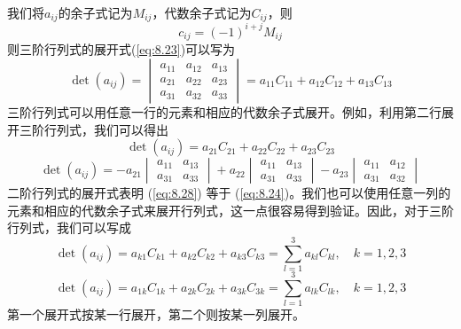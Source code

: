     我们将$a_{ij}$的余子式记为$M_{ij}$，代数余子式记为$C_{ij}$，则
    \begin{equation}
        c_{ij} = \left(-1\right)^{i+j}M_{ij}
        \label{eq:8.25}
    \end{equation}
    则三阶行列式的展开式(\ref{eq:8.23})可以写为
    \begin{equation}
        \det\left(a_{ij}\right) = \begin{vmatrix}
            a_{11} & a_{12} & a_{13} \\
            a_{21} & a_{22} & a_{23} \\
            a_{31} & a_{32} & a_{33}
        \end{vmatrix} = a_{11}C_{11} + a_{12}C_{12} + a_{13}C_{13}
        \label{eq:8.26}
    \end{equation}
    三阶行列式可以用任意一行的元素和相应的代数余子式展开。例如，利用第二行展开三阶行列式，我们可以得出
    \begin{equation}
        \det\left(a_{ij}\right) = a_{21}C_{21} + a_{22}C_{22} + a_{23}C_{23}
        \label{eq:8.27}
    \end{equation}
    \begin{equation}
        \det\left(a_{ij}\right) = -a_{21}\begin{vmatrix}
            a_{11} & a_{13} \\
            a_{31} & a_{33}
        \end{vmatrix} + a_{22}\begin{vmatrix}
            a_{11} & a_{13} \\
            a_{31} & a_{33}
        \end{vmatrix} - a_{23}\begin{vmatrix}
            a_{11} & a_{12} \\
            a_{31} & a_{32}
        \end{vmatrix}
        \label{eq:8.28}
    \end{equation}
    二阶行列式的展开式表明 (\ref{eq:8.28}) 等于 (\ref{eq:8.24})。我们也可以使用任意一列的元素和相应的代数余子式来展开行列式，这一点很容易得到验证。因此，对于三阶行列式，我们可以写成
    \begin{equation*}
        \det\left(a_{ij}\right) = a_{k1}C_{k1} + a_{k2}C_{k2} + a_{k3}C_{k3} = \sum_{l=1}^{3} a_{kl}C_{kl}, \quad k = 1,2,3
    \end{equation*}
    \begin{equation*}
        \det\left(a_{ij}\right) = a_{1k}C_{1k} + a_{2k}C_{2k} + a_{3k}C_{3k} = \sum_{l=1}^{3} a_{lk}C_{lk}, \quad k = 1,2,3
    \end{equation*}
    第一个展开式按某一行展开，第二个则按某一列展开。

